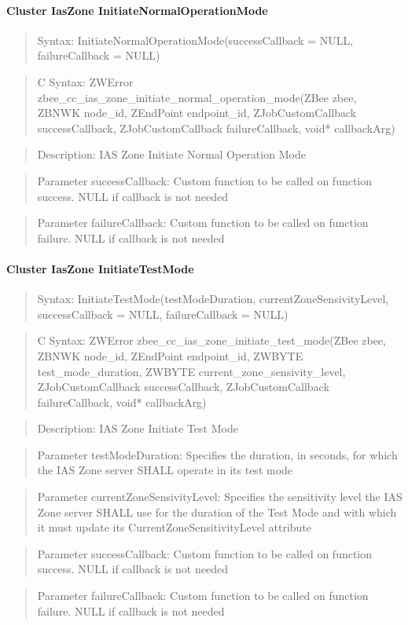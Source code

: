 \paragraph{Cluster IasZone InitiateNormalOperationMode}
\begin{quote}Syntax: InitiateNormalOperationMode(successCallback = NULL, failureCallback = NULL)\end{quote}
\begin{quote}C Syntax: ZWError zbee\_cc\_ias\_zone\_initiate\_normal\_operation\_mode(ZBee zbee, ZBNWK node\_id, ZEndPoint endpoint\_id, ZJobCustomCallback successCallback, ZJobCustomCallback failureCallback, void* callbackArg)\end{quote}
\begin{quote}Description: IAS Zone Initiate Normal Operation Mode\end{quote}
\begin{quote}Parameter successCallback: Custom function to be called on function success. NULL if callback is not needed\end{quote}
\begin{quote}Parameter failureCallback: Custom function to be called on function failure. NULL if callback is not needed\end{quote}


\paragraph{Cluster IasZone InitiateTestMode}
\begin{quote}Syntax: InitiateTestMode(testModeDuration, currentZoneSensivityLevel, successCallback = NULL, failureCallback = NULL)\end{quote}
\begin{quote}C Syntax: ZWError zbee\_cc\_ias\_zone\_initiate\_test\_mode(ZBee zbee, ZBNWK node\_id, ZEndPoint endpoint\_id, ZWBYTE test\_mode\_duration, ZWBYTE current\_zone\_sensivity\_level, ZJobCustomCallback successCallback, ZJobCustomCallback failureCallback, void* callbackArg)\end{quote}
\begin{quote}Description: IAS Zone Initiate Test Mode\end{quote}
\begin{quote}Parameter testModeDuration: Specifies the duration, in seconds, for which the IAS Zone server SHALL operate in its test mode\end{quote}
\begin{quote}Parameter currentZoneSensivityLevel: Specifies the sensitivity level the IAS Zone server SHALL use for the duration of the Test Mode and with which it must update its CurrentZoneSensitivityLevel attribute\end{quote}
\begin{quote}Parameter successCallback: Custom function to be called on function success. NULL if callback is not needed\end{quote}
\begin{quote}Parameter failureCallback: Custom function to be called on function failure. NULL if callback is not needed\end{quote}


